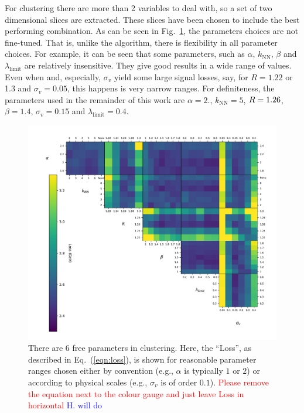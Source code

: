 For \spectral{} clustering there are more than 2 variables to deal with, 
so a set of two dimensional slices are extracted. 
These slices have been chosen to include the best performing combination.
%
    As can be seen in Fig.~\ref{fig:scan_spectral}, the parameters choices  are not fine-tuned. That is, 
    unlike the \antikt{} algorithm, there is flexibility in all parameter choices. For example, it can be seen that some parameters, such as \(\alpha\), \(k_\text{NN}\), \(\beta\)
                and \(\lambda_\text{limit}\) are relatively insensitive.
                They give good results in a wide range of values.
                Even when \stoppingdeltar{} and, especially, \(\sigma_v\) yield some large signal losses, say, for $R=1.22$ or 1.3 and $\sigma_v=0.05$, this happens is very narrow ranges.  For definiteness, the
    parameters used in the remainder of this work are \(\alpha=2.\), \(k_\text{NN}=5\), \(R{} = 1.26\), \(\beta = 1.4\), \(\sigma_v = 0.15\) and \(\lambda_\text{limit} = 0.4\).
\clearpage
    \begin{figure}[!t]
            \includegraphics[width=1\textwidth]{graphics/trangle_scan_complete}
            \caption{There are 6 free parameters in \spectral{} clustering.
                Here, the ``Loss'', as described in Eq.~(\ref{eqn:loss}), is shown for reasonable  parameter ranges chosen
                either by convention (e.g., \(\alpha\) is typically \(1\) or \(2\))
                or according to physical scales (e.g., $\sigma_v$ is of order \(0.1\)).
                {\textcolor{red}{Please remove the equation next to the colour gauge and just leave Loss in horizontal}
                \textcolor{blue}{H. will do}}
             }\label{fig:scan_spectral}
    \end{figure}    


